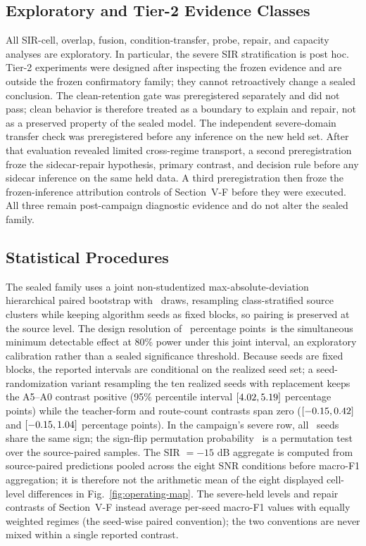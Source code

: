 \documentclass[letterpaper,journal]{IEEEtran}
\newcommand{\pp}{percentage points}
\begin{document}
\subsection{Exploratory and Tier-2 Evidence Classes}
All SIR-cell, overlap, fusion, condition-transfer, probe, repair, and
capacity analyses are exploratory. In particular, the severe SIR
stratification is post hoc. Tier-2 experiments were designed after inspecting
the frozen evidence and are outside the frozen confirmatory family; they cannot
retroactively change a sealed conclusion. The clean-retention gate was
preregistered separately and did not pass; clean behavior is therefore treated
as a boundary to explain and repair, not as a preserved property of the sealed
model.
The independent severe-domain transfer check was preregistered before any
inference on the new held set. After that evaluation revealed limited
cross-regime transport, a second preregistration froze the sidecar-repair
hypothesis, primary contrast, and decision rule before any sidecar inference
on the same held data. A third preregistration then froze the
frozen-inference attribution controls of Section~V-F before they were
executed. All three remain post-campaign diagnostic evidence and do not alter
the sealed family.

\subsection{Statistical Procedures}
The sealed family uses a joint non-studentized max-absolute-deviation
hierarchical paired bootstrap with \ProtocolBootstrapDraws\ draws, resampling
class-stratified source clusters while keeping algorithm seeds as fixed
blocks, so pairing is preserved at the source level. The design resolution of
\DesignResolution\ \pp\ is the simultaneous minimum detectable effect at 80\%
power under this joint interval, an exploratory calibration rather than a
sealed significance threshold. Because seeds are fixed blocks, the reported
intervals are conditional on the realized seed set; a seed-randomization
variant resampling the ten realized seeds with replacement keeps the A5--A0
contrast positive (95\% percentile interval
$[4.02,5.19]$ \pp) while the teacher-form and
route-count contrasts span zero
($[-0.15,0.42]$ and
$[-0.15,1.04]$ \pp). In the campaign's severe row, all
\SevereGainIqformerPositiveSeeds\ seeds share the same sign; the sign-flip
permutation probability \SevereGainIqformerSignFlipP\ is a permutation test
over the source-paired samples. The SIR $=-15$ dB aggregate is computed from
source-paired predictions pooled across the eight SNR conditions before
macro-F1 aggregation; it is therefore not the arithmetic mean of the eight
displayed cell-level differences in Fig.~\ref{fig:operating-map}. The
severe-held levels and repair contrasts of Section~V-F instead average
per-seed macro-F1 values with equally weighted regimes (the seed-wise paired
convention); the two conventions are never mixed within a single reported
contrast.
\end{document}
